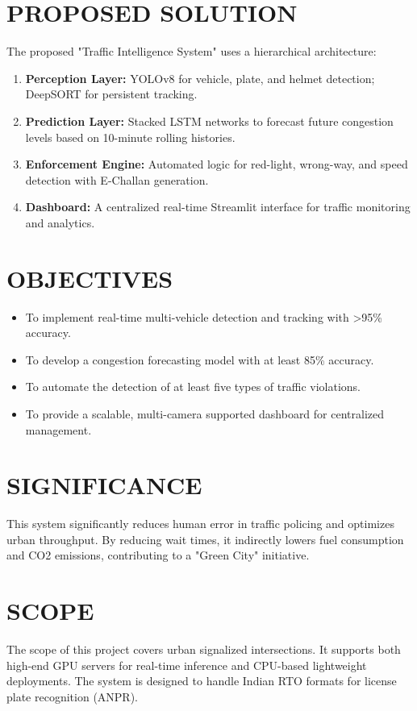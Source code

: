 \documentclass[12pt,times,a4paper]{report}
\begin{document}
\section{PROPOSED SOLUTION}
The proposed "Traffic Intelligence System" uses a hierarchical architecture:
\begin{enumerate}
    \item \textbf{Perception Layer:} YOLOv8 for vehicle, plate, and helmet detection; DeepSORT for persistent tracking.
    \item \textbf{Prediction Layer:} Stacked LSTM networks to forecast future congestion levels based on 10-minute rolling histories.
    \item \textbf{Enforcement Engine:} Automated logic for red-light, wrong-way, and speed detection with E-Challan generation.
    \item \textbf{Dashboard:} A centralized real-time Streamlit interface for traffic monitoring and analytics.
\end{enumerate}

\section{OBJECTIVES}
\begin{itemize}
    \item To implement real-time multi-vehicle detection and tracking with >95\% accuracy.
    \item To develop a congestion forecasting model with at least 85\% accuracy.
    \item To automate the detection of at least five types of traffic violations.
    \item To provide a scalable, multi-camera supported dashboard for centralized management.
\end{itemize}

\section{SIGNIFICANCE}
This system significantly reduces human error in traffic policing and optimizes urban throughput. By reducing wait times, it indirectly lowers fuel consumption and CO2 emissions, contributing to a "Green City" initiative.

\section{SCOPE}
The scope of this project covers urban signalized intersections. It supports both high-end GPU servers for real-time inference and CPU-based lightweight deployments. The system is designed to handle Indian RTO formats for license plate recognition (ANPR).
\end{document}
